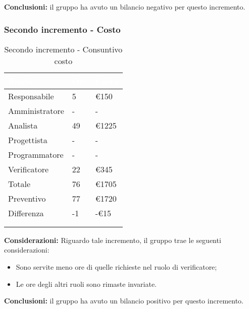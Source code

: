 {{        \textbf{Conclusioni:} il gruppo ha avuto un bilancio negativo per questo incremento.
    }

    \newpage
    \subsubsection{Secondo incremento - Costo}
    {
      \setlength{\freewidth}{\dimexpr\textwidth-30\tabcolsep}
      \renewcommand{\arraystretch}{1.0}
      \centering
      \setlength{\aboverulesep}{0pt}
      \setlength{\belowrulesep}{0pt}
      \begin{longtable}{C{.4\freewidth} C{.2\freewidth} C{.2\freewidth}}
      \toprule
      \textcolor{white}{\textbf{Ruolo}}&
      \textcolor{white}{\textbf{Ore}}&
      \textcolor{white}{\textbf{Costo}}\\
      \toprule
      \endhead

      Responsabile & 5 & \euro150 \\
      Amministratore & - & - \\
      Analista & 49 & \euro1225 \\
      Progettista & - & - \\
      Programmatore & - & - \\
      Verificatore & 22 & \euro345 \\
      Totale & 76 & \euro1705 \\
      Preventivo & 77 & \euro1720 \\
      Differenza & -1 & -\euro15 \\
      \bottomrule
      \\
      \caption{Secondo incremento - Consuntivo costo}

      \end{longtable} 
    
      \textbf{Considerazioni:} 
        Riguardo tale incremento, il gruppo trae le seguenti considerazioni:
        \begin{itemize}
            \item Sono servite meno ore di quelle richieste nel ruolo di verificatore;
            \item Le ore degli altri ruoli sono rimaste invariate.
        \end{itemize}

        \textbf{Conclusioni:} il gruppo ha avuto un bilancio positivo per questo incremento. 
    }

}
